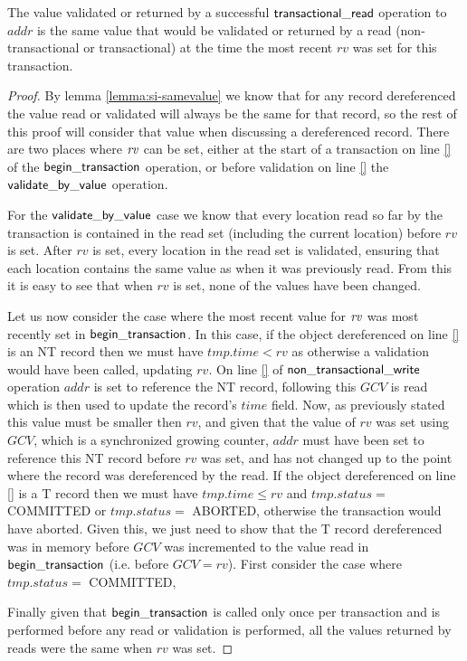 \begin{lemma}
\label{lemma:si-rvvalid}
The value validated or returned by a successful $\sf{transactional\_read}$ operation to $\mathit{addr}$ is the same
value that would be validated or returned by a read (non-transactional or transactional) at the time the most recent
$\mathit{rv}$ was set for this transaction.
\end{lemma}
\begin{proof}
By lemma \ref{lemma:si-samevalue} we know that for any record dereferenced the value read or validated will
always be the same for that record, so the rest of this proof will consider that value when discussing
a dereferenced record.
There are two places where $\ms{rv}$ can be set, either at the start of a transaction on line \ref{} of the
$\sf{begin\_transaction}$ operation, or before validation on line \ref{} the $\sf{validate\_by\_value}$ operation.

For the $\sf{validate\_by\_value}$ case we know that every location read so far by the transaction is contained
in the read set (including the current location) before $\mathit{rv}$ is set.
After $\mathit{rv}$ is set, every location in the read set is validated, ensuring that each location contains the same
value as when it was previously read.
From this it is easy to see that when $\mathit{rv}$ is set, none of the values have been changed.

Let us now consider the case where the most recent value for $\ms{rv}$ was most recently set in $\sf{begin\_transaction}$.
In this case, if the object dereferenced on line \ref{} is an NT record then we must have $\mathit{tmp.time} < \mathit{rv}$
as otherwise a validation would have been called, updating $\mathit{rv}$.
On line \ref{} of $\sf{non\_transactional\_write}$ operation $\mathit{addr}$ is set to reference the NT record, following this
$\mathit{GCV}$ is read which is then used to update the record's $\mathit{time}$ field.
Now, as previously stated this value must be smaller then $\mathit{rv}$, and given that the value of $\mathit{rv}$
was set using $\mathit{GCV}$, which is a synchronized growing counter, $\mathit{addr}$ must have been set to reference
this NT record before $\mathit{rv}$ was set, and has not changed up to the point where the record was dereferenced by the read.
If the object dereferenced on line \ref{} is a T record then we must have $\mathit{tmp.time} \leq \mathit{rv}$ and 
$\mathit{tmp.status} = $ COMMITTED or $\mathit{tmp.status} = $ ABORTED, otherwise the transaction would have aborted.
Given this, we just need to show that the T record dereferenced was in memory before $\mathit{GCV}$ was incremented to the value
read in $\sf{begin\_transaction}$ (i.e. before $\mathit{GCV} = \mathit{rv}$).
First consider the case where $\mathit{tmp.status} = $ COMMITTED, 

Finally given that $\sf{begin\_transaction}$ is called only once per transaction and is performed before any read or validation is performed,
all the values returned by reads were the same when $\mathit{rv}$ was set.
\end{proof}




